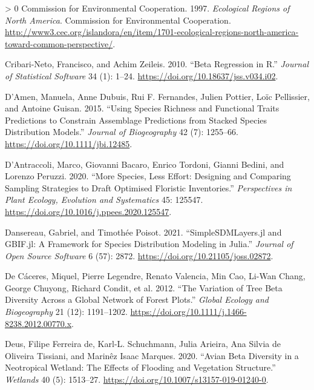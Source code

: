 \documentclass[11pt]{article}
\newlength{\cslhangindent}
\newenvironment{CSLReferences}[3] %
 {%
  \setlength{\parindent}{0pt}
  \ifodd #1 \everypar{\setlength{\hangindent}{\cslhangindent}}\ignorespaces\fi
  \ifnum #2 > 0
  \setlength{\parskip}{#2\baselineskip}
  \fi
 }%
 {}
\begin{document}
\begin{CSLReferences}{1}{0}
\leavevmode\hypertarget{ref-CommissionforEnvironmentalCooperation1997EcoReg}{}%
Commission for Environmental Cooperation. 1997. \emph{Ecological Regions
of North America}. Commission for Environmental Cooperation.
\url{http://www3.cec.org/islandora/en/item/1701-ecological-regions-north-america-toward-common-perspective/}.

\leavevmode\hypertarget{ref-Cribari-Neto2010BetReg}{}%
Cribari-Neto, Francisco, and Achim Zeileis. 2010. {``Beta Regression in
R.''} \emph{Journal of Statistical Software} 34 (1): 1--24.
\url{https://doi.org/10.18637/jss.v034.i02}.

\leavevmode\hypertarget{ref-DAmen2015UsiSpe}{}%
D'Amen, Manuela, Anne Dubuis, Rui F. Fernandes, Julien Pottier, Loïc
Pellissier, and Antoine Guisan. 2015. {``Using Species Richness and
Functional Traits Predictions to Constrain Assemblage Predictions from
Stacked Species Distribution Models.''} \emph{Journal of Biogeography}
42 (7): 1255--66. \url{https://doi.org/10.1111/jbi.12485}.

\leavevmode\hypertarget{ref-DAntraccoli2020MorSpe}{}%
D'Antraccoli, Marco, Giovanni Bacaro, Enrico Tordoni, Gianni Bedini, and
Lorenzo Peruzzi. 2020. {``More Species, Less Effort: Designing and
Comparing Sampling Strategies to Draft Optimised Floristic
Inventories.''} \emph{Perspectives in Plant Ecology, Evolution and
Systematics} 45: 125547.
\url{https://doi.org/10.1016/j.ppees.2020.125547}.

\leavevmode\hypertarget{ref-Dansereau2021SimJl}{}%
Dansereau, Gabriel, and Timothée Poisot. 2021. {``SimpleSDMLayers.jl and
GBIF.jl: A Framework for Species Distribution Modeling in Julia.''}
\emph{Journal of Open Source Software} 6 (57): 2872.
\url{https://doi.org/10.21105/joss.02872}.

\leavevmode\hypertarget{ref-DeCaceres2012VarTre}{}%
De Cáceres, Miquel, Pierre Legendre, Renato Valencia, Min Cao, Li-Wan
Chang, George Chuyong, Richard Condit, et al. 2012. {``The Variation of
Tree Beta Diversity Across a Global Network of Forest Plots.''}
\emph{Global Ecology and Biogeography} 21 (12): 1191--1202.
\url{https://doi.org/10.1111/j.1466-8238.2012.00770.x}.

\leavevmode\hypertarget{ref-deDeus2020AviBet}{}%
Deus, Filipe Ferreira de, Karl-L. Schuchmann, Julia Arieira, Ana Silvia
de Oliveira Tissiani, and Marinêz Isaac Marques. 2020. {``Avian Beta
Diversity in a Neotropical Wetland: The Effects of Flooding and
Vegetation Structure.''} \emph{Wetlands} 40 (5): 1513--27.
\url{https://doi.org/10.1007/s13157-019-01240-0}.


\end{CSLReferences}
\end{document}

